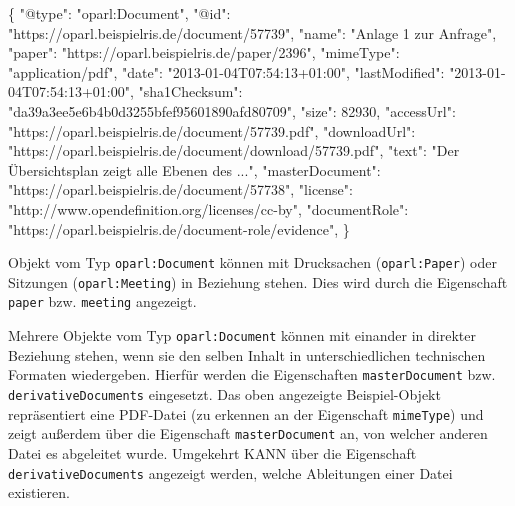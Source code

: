 \documentclass[,a4paper]{article}
\newenvironment{Shaded}{}{}
\newcommand{\DataTypeTok}[1]{\textcolor[rgb]{0.56,0.13,0.00}{{#1}}}
\newcommand{\DecValTok}[1]{\textcolor[rgb]{0.25,0.63,0.44}{{#1}}}
\newcommand{\StringTok}[1]{\textcolor[rgb]{0.25,0.44,0.63}{{#1}}}
\newcommand{\NormalTok}[1]{{#1}}
\begin{document}
\begin{Shaded}
\begin{Highlighting}[]
\NormalTok{\{}
    \DataTypeTok{"@type"}\NormalTok{: }\StringTok{"oparl:Document"}\NormalTok{,}
    \DataTypeTok{"@id"}\NormalTok{: }\StringTok{"https://oparl.beispielris.de/document/57739"}\NormalTok{,}
    \DataTypeTok{"name"}\NormalTok{: }\StringTok{"Anlage 1 zur Anfrage"}\NormalTok{,}
    \DataTypeTok{"paper"}\NormalTok{: }\StringTok{"https://oparl.beispielris.de/paper/2396"}\NormalTok{,}
    \DataTypeTok{"mimeType"}\NormalTok{: }\StringTok{"application/pdf"}\NormalTok{,}
    \DataTypeTok{"date"}\NormalTok{: }\StringTok{"2013-01-04T07:54:13+01:00"}\NormalTok{,}
    \DataTypeTok{"lastModified"}\NormalTok{: }\StringTok{"2013-01-04T07:54:13+01:00"}\NormalTok{,}
    \DataTypeTok{"sha1Checksum"}\NormalTok{: }\StringTok{"da39a3ee5e6b4b0d3255bfef95601890afd80709"}\NormalTok{,}
    \DataTypeTok{"size"}\NormalTok{: }\DecValTok{82930}\NormalTok{,}
    \DataTypeTok{"accessUrl"}\NormalTok{: }\StringTok{"https://oparl.beispielris.de/document/57739.pdf"}\NormalTok{,}
    \DataTypeTok{"downloadUrl"}\NormalTok{: }\StringTok{"https://oparl.beispielris.de/document/download/57739.pdf"}\NormalTok{,}
    \DataTypeTok{"text"}\NormalTok{: }\StringTok{"Der Übersichtsplan zeigt alle Ebenen des ..."}\NormalTok{,}
    \DataTypeTok{"masterDocument"}\NormalTok{: }\StringTok{"https://oparl.beispielris.de/document/57738"}\NormalTok{,}
    \DataTypeTok{"license"}\NormalTok{: }\StringTok{"http://www.opendefinition.org/licenses/cc-by"}\NormalTok{,}
    \DataTypeTok{"documentRole"}\NormalTok{: }\StringTok{"https://oparl.beispielris.de/document-role/evidence"}\NormalTok{,}
\NormalTok{\}}
\end{Highlighting}
\end{Shaded}

Objekt vom Typ \texttt{oparl:Document} können mit Drucksachen
(\texttt{oparl:Paper}) oder Sitzungen (\texttt{oparl:Meeting}) in
Beziehung stehen. Dies wird durch die Eigenschaft \texttt{paper} bzw.
\texttt{meeting} angezeigt.

Mehrere Objekte vom Typ \texttt{oparl:Document} können mit einander in
direkter Beziehung stehen, wenn sie den selben Inhalt in
unterschiedlichen technischen Formaten wiedergeben. Hierfür werden die
Eigenschaften \texttt{masterDocument} bzw. \texttt{derivativeDocuments}
eingesetzt. Das oben angezeigte Beispiel-Objekt repräsentiert eine
PDF-Datei (zu erkennen an der Eigenschaft \texttt{mimeType}) und zeigt
außerdem über die Eigenschaft \texttt{masterDocument} an, von welcher
anderen Datei es abgeleitet wurde. Umgekehrt KANN über die Eigenschaft
\texttt{derivativeDocuments} angezeigt werden, welche Ableitungen einer
Datei existieren.
\end{document}
